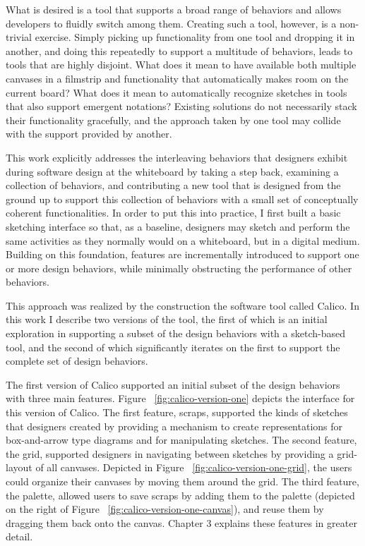 What is desired is a tool that supports a broad range of behaviors and allows developers to fluidly switch among them. Creating such a tool, however, is a non-trivial exercise. Simply picking up functionality from one tool and dropping it in another, and doing this repeatedly to support a multitude of behaviors, leads to tools that are highly disjoint. What does it mean to have available both multiple canvases in a filmstrip and functionality that automatically makes room on the current board?  What does it mean to automatically recognize sketches in tools that also support emergent notations? Existing solutions do not necessarily stack their functionality gracefully, and the approach taken by one tool may collide with the support provided by another.

This work explicitly addresses the interleaving behaviors that designers exhibit during software design at the whiteboard by taking a step back, examining a collection of behaviors, and contributing a new tool that is designed from the ground up to support this collection of behaviors with a small set of conceptually coherent functionalities. In order to put this into practice, I first built a basic sketching interface so that, as a baseline, designers may sketch and perform the same activities as they normally would on a whiteboard, but in a digital medium. Building on this foundation, features are incrementally introduced to support one or more design behaviors, while minimally obstructing the performance of other behaviors. 

This approach was realized by the construction the software tool called Calico. In this work I describe two versions of the tool, the first of which is an initial exploration in supporting a subset of the design behaviors with a sketch-based tool, and the second of which significantly iterates on the first to support the complete set of design behaviors. 

The first version of Calico supported an initial subset of the design behaviors with three main features. Figure  ~\ref{fig:calico-version-one} depicts the interface for this version of Calico. The first feature, scraps, supported the kinds of sketches that designers created by providing a mechanism to create representations for box-and-arrow type diagrams and for manipulating sketches. The second feature, the grid, supported designers in navigating between sketches by providing a grid-layout of all canvases. Depicted in Figure ~\ref{fig:calico-version-one-grid}, the users could organize their canvases by moving them around the grid. The third feature, the palette, allowed users to save scraps by adding them to the palette (depicted on the right of Figure ~\ref{fig:calico-version-one-canvas}), and reuse them by dragging them back onto the canvas. Chapter 3 explains these features in greater detail.

